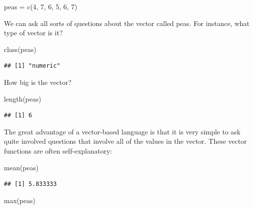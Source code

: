 \documentclass[
]{book}
\newenvironment{Shaded}{\begin{snugshade}}{\end{snugshade}}
\newcommand{\DecValTok}[1]{\textcolor[rgb]{0.00,0.00,0.81}{#1}}
\newcommand{\FunctionTok}[1]{\textcolor[rgb]{0.00,0.00,0.00}{#1}}
\newcommand{\NormalTok}[1]{#1}
\newcommand{\OtherTok}[1]{\textcolor[rgb]{0.56,0.35,0.01}{#1}}
\theoremstyle{definition}
\theoremstyle{definition}
\theoremstyle{definition}
\theoremstyle{definition}
\theoremstyle{remark}
\begin{document}
\begin{Shaded}
\begin{Highlighting}[]
\NormalTok{peas }\OtherTok{=} \FunctionTok{c}\NormalTok{(}\DecValTok{4}\NormalTok{, }\DecValTok{7}\NormalTok{, }\DecValTok{6}\NormalTok{, }\DecValTok{5}\NormalTok{, }\DecValTok{6}\NormalTok{, }\DecValTok{7}\NormalTok{)}
\end{Highlighting}
\end{Shaded}

We can ask all sorts of questions about the vector called peas. For instance, what type of vector is it?

\begin{Shaded}
\begin{Highlighting}[]
\FunctionTok{class}\NormalTok{(peas)}
\end{Highlighting}
\end{Shaded}

\begin{verbatim}
## [1] "numeric"
\end{verbatim}

How big is the vector?

\begin{Shaded}
\begin{Highlighting}[]
\FunctionTok{length}\NormalTok{(peas)}
\end{Highlighting}
\end{Shaded}

\begin{verbatim}
## [1] 6
\end{verbatim}

The great advantage of a vector-based language is that it is very simple to ask quite involved questions that involve all of the values in the vector. These vector functions are often self-explanatory:

\begin{Shaded}
\begin{Highlighting}[]
\FunctionTok{mean}\NormalTok{(peas)}
\end{Highlighting}
\end{Shaded}

\begin{verbatim}
## [1] 5.833333
\end{verbatim}

\begin{Shaded}
\begin{Highlighting}[]
\FunctionTok{max}\NormalTok{(peas)}
\end{Highlighting}
\end{Shaded}
\end{document}
